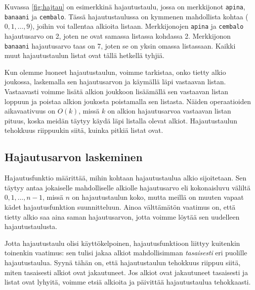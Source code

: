 Kuvassa \ref{fig:hajtau} on esimerkkinä hajautustaulu, jossa on
merkkijonot \texttt{apina}, \texttt{banaani} ja \texttt{cembalo}.
Tässä hajautustaulussa on kymmenen mahdollista kohtaa
($0,1,\ldots,9$), joihin voi tallentaa alkioita listaan.
Merkkijonojen \texttt{apina} ja \texttt{cembalo}
hajautusarvo on 2, joten ne ovat samassa listassa kohdassa 2.
Merkkijonon \texttt{banaani} hajautusarvo taas on 7,
joten se on yksin omassa listassaan.
Kaikki muut hajautustaulun listat ovat tällä hetkellä tyhjiä.

Kun olemme luoneet hajautustaulun, voimme tarkistaa,
onko tietty alkio joukossa, laskemalla sen hajautusarvon
ja käymällä läpi vastaavan listan.
Vastaavasti voimme lisätä alkion joukkoon
lisäämällä sen vastaavan listan loppuun ja poistaa
alkion joukosta poistamalla sen listasta.
Näiden operaatioiden aikavaativuus on $O(k)$,
missä $k$ on alkion hajautusarvoa vastaavan listan pituus,
koska meidän täytyy käydä läpi listalla olevat alkiot.
Hajautustaulun tehokkuus riippuukin siitä,
kuinka pitkiä listat ovat.

\subsection{Hajautusarvon laskeminen}

Hajautusfunktio määrittää, mihin kohtaan hajautustaulua
alkio sijoitetaan.
Sen täytyy antaa jokaiselle mahdolliselle alkiolle
hajautusarvo eli kokonaisluvu väliltä $0,1,\ldots,n-1$,
missä $n$ on hajautustaulun koko,
mutta meillä on muuten vapaat kädet hajautusfunktion suunnitteluun.
Ainoa välttämätön vaatimus on, että tietty alkio saa aina
saman hajautusarvon, jotta voimme löytää sen uudelleen
hajautustaulusta.

Jotta hajautustaulu olisi käyttökelpoinen, hajautusfunktioon
liittyy kuitenkin toinenkin vaatimus:
sen tulisi jakaa alkiot mahdollisimman \emph{tasaisesti}
eri puolille hajautustaulua.
Syynä tähän on, että hajautustaulun tehokkuus riippuu siitä,
miten tasaisesti alkiot ovat jakautuneet.
Jos alkiot ovat jakautuneet tasaisesti ja listat ovat lyhyitä,
voimme etsiä alkioita ja päivittää hajautustaulua tehokkaasti.

